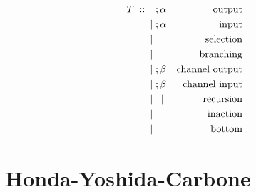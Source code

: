 \documentclass{article}
\begin{document}
\begin{align*}
  T \grmeq & \sendType{\VEC S}\alpha  & \text{output}\\
    \grmor & \recvType{\VEC S}\alpha  & \text{input}\\
    \grmor & \selectType{l}{\alpha}   & \text{selection}\\
    \grmor & \branchType{l}\alpha     & \text{branching}\\
    \grmor & \hosendType{\alpha}\beta & \text{channel output}\\
    \grmor & \horecvType{\alpha}\beta & \text{channel input}\\
    \grmor & \recurType{t}{\alpha} \grmor \recvarType t
                                      & \text{recursion}\\
    \grmor & \EndType                 & \text{inaction}\\
    \grmor & \bottomType              & \text{bottom}\\
\end{align*}

\section{Honda-Yoshida-Carbone}
\end{document}
